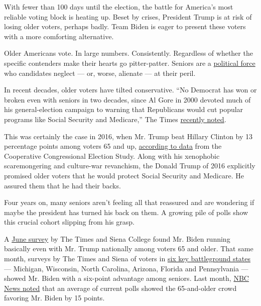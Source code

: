 With fewer than 100 days until the election, the battle for America's
most reliable voting block is heating up. Beset by crises, President
Trump is at risk of losing older voters, perhaps badly. Team Biden is
eager to present these voters with a more comforting alternative.

Older Americans vote. In large numbers. Consistently. Regardless of
whether the specific contenders make their hearts go pitter-patter.
Seniors are a
\href{https://www.nytimes3xbfgragh.onion/2020/03/27/us/politics/biden-trump-seniors.html}{political
force} who candidates neglect --- or, worse, alienate --- at their
peril.

In recent decades, older voters have tilted conservative. ``No Democrat
has won or broken even with seniors in two decades, since Al Gore in
2000 devoted much of his general-election campaign to warning that
Republicans would cut popular programs like Social Security and
Medicare,'' The Times
\href{https://www.nytimes3xbfgragh.onion/2020/06/28/us/politics/trump-approval-older-voters-coronavirus.html}{recently
noted}.

This was certainly the case in 2016, when Mr. Trump beat Hillary Clinton
by 13 percentage points among voters 65 and up,
\href{https://fivethirtyeight.com/features/are-older-voters-turning-away-from-trump/}{according
to data} from the Cooperative Congressional Election Study. Along with
his xenophobic scaremongering and culture-war revanchism, the Donald
Trump of 2016 explicitly promised older voters that he would protect
Social Security and Medicare. He assured them that he had their backs.

Four years on, many seniors aren't feeling all that reassured and are
wondering if maybe the president has turned his back on them. A growing
pile of polls show this crucial cohort slipping from his grasp.

A
\href{https://www.nytimes3xbfgragh.onion/2020/06/24/us/politics/trump-biden-poll-nyt-upshot-siena-college.html}{June
survey} by The Times and Siena College found Mr. Biden running basically
even with Mr. Trump nationally among voters 65 and older. That same
month, surveys by The Times and Siena of voters in
\href{https://www.nytimes3xbfgragh.onion/2020/06/25/upshot/poll-2020-biden-battlegrounds.html}{six
key battleground states} --- Michigan, Wisconsin, North Carolina,
Arizona, Florida and Pennsylvania --- showed Mr. Biden with a six-point
advantage among seniors. Last month,
\href{https://www.nbcnews.com/politics/2020-election/who-s-behind-trump-s-big-polling-deficit-two-key-n1234605}{NBC
News noted} that an average of current polls showed the 65-and-older
crowd favoring Mr. Biden by 15 points.

